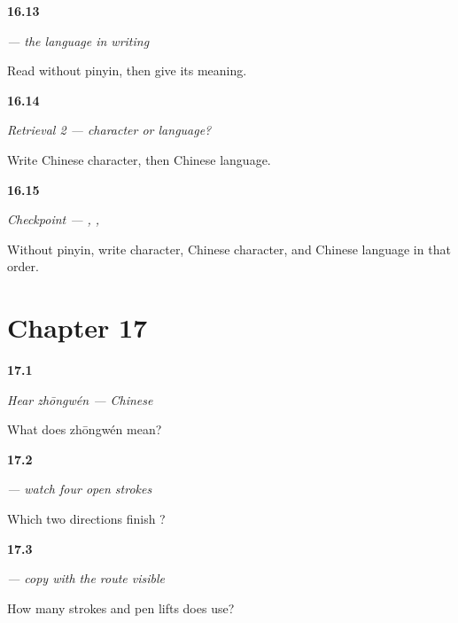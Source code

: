 \noindent\begin{minipage}[t]{\linewidth}
\raggedright
\hypertarget{review-ZH-C16-hanyu-read}{\textbf{16.13}} \emph{ — the language in writing}\par
\small Read  without pinyin, then give its meaning.
\end{minipage}\par\medskip

\noindent\begin{minipage}[t]{\linewidth}
\raggedright
\hypertarget{review-ZH-R16-identity-2-contrast}{\textbf{16.14}} \emph{Retrieval 2 — character or language?}\par
\small Write Chinese character, then Chinese language.
\end{minipage}\par\medskip

\noindent\begin{minipage}[t]{\linewidth}
\raggedright
\hypertarget{review-ZH-C16-practice-pass}{\textbf{16.15}} \emph{Checkpoint — , , }\par
\small Without pinyin, write character, Chinese character, and Chinese language in that order.
\end{minipage}\par\medskip

\section*{Chapter 17}

\noindent\begin{minipage}[t]{\linewidth}
\raggedright
\hypertarget{review-ZH-C17-hear-zhongwen-meaning}{\textbf{17.1}} \emph{Hear \emph{zhōngwén} — Chinese}\par
\small What does zhōngwén mean?
\end{minipage}\par\medskip

\noindent\begin{minipage}[t]{\linewidth}
\raggedright
\hypertarget{review-ZH-W17-wen-observe-order}{\textbf{17.2}} \emph{ — watch four open strokes}\par
\small Which two directions finish ?
\end{minipage}\par\medskip

\noindent\begin{minipage}[t]{\linewidth}
\raggedright
\hypertarget{review-ZH-W17-wen-guided-count}{\textbf{17.3}} \emph{ — copy with the route visible}\par
\small How many strokes and pen lifts does  use?
\end{minipage}\par\medskip

